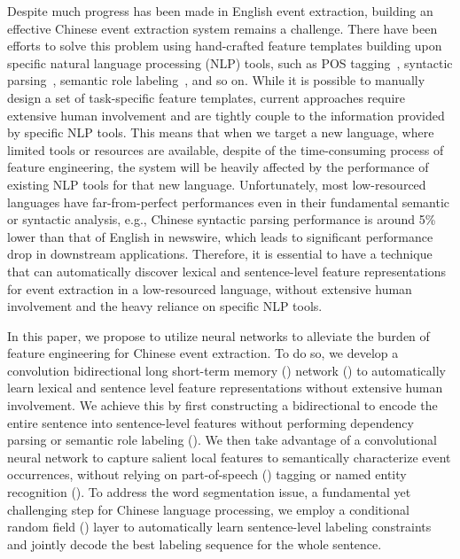 Despite much progress has been made in English event extraction, building an effective Chinese event extraction system
remains a challenge. There have been efforts to solve this problem using hand-crafted feature templates
building upon specific natural language processing (NLP) tools, such as POS tagging~\cite{}, syntactic parsing~\cite{}, semantic role labeling~\cite{}, and so on.
While it is possible to manually design a set of task-specific feature templates, current approaches require extensive human involvement
and are tightly couple to the information provided by specific NLP tools. This means that when we target a new  language,  where limited tools or resources are available,
despite of the time-consuming process of feature engineering, the system will be heavily affected by the performance of existing NLP tools
for that new language. Unfortunately, most low-resourced languages have far-from-perfect performances even in their fundamental semantic or
syntactic analysis, e.g., Chinese syntactic parsing performance is around 5\% lower than that of English in newswire, which leads to significant
performance drop in downstream applications.
Therefore, it is essential to have a technique that can automatically discover lexical and sentence-level
feature representations for event extraction in a low-resourced language, without extensive human involvement and the heavy reliance on specific NLP tools.

In this paper, we propose to utilize neural networks to alleviate the burden of feature
engineering for Chinese event extraction. To do so, we develop a convolution bidirectional long short-term memory
(\LSTM) network (\CBiLSTM) to automatically learn lexical and sentence level feature representations without extensive human
involvement. We achieve this by first constructing a bidirectional \LSTM to encode the entire sentence into
sentence-level features without performing dependency parsing or semantic role labeling (\SRL). %
We then take advantage of a convolutional neural network to capture salient local features
to semantically characterize event occurrences, %
without relying on part-of-speech (\POS) tagging or named entity
recognition (\NER). %
To address the word segmentation issue, a fundamental yet challenging step for Chinese language processing, we employ
a conditional random field (\CRF) layer to automatically learn sentence-level labeling constraints and jointly decode
the best labeling sequence for the whole sentence.

